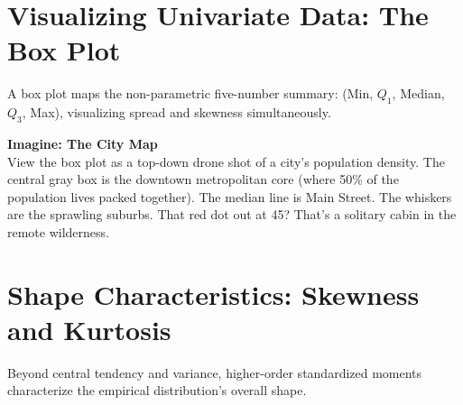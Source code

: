 \documentclass[12pt]{article}
\begin{document}
\section*{Visualizing Univariate Data: The Box Plot}
A box plot maps the non-parametric five-number summary: (Min, $Q_1$, Median, $Q_3$, Max), visualizing spread and skewness simultaneously.

\vspace{0.5cm}
\begin{center}
\end{center}
\vspace{0.2cm}

\vspace{0.5em}
\noindent\textbf{Imagine: The City Map}\\
View the box plot as a top-down drone shot of a city's population density. The central gray box is the downtown metropolitan core (where 50\% of the population lives packed together). The median line is Main Street. The whiskers are the sprawling suburbs. That red dot out at 45? That's a solitary cabin in the remote wilderness.


\section*{Shape Characteristics: Skewness and Kurtosis}
Beyond central tendency and variance, higher-order standardized moments characterize the empirical distribution's overall shape.
\end{document}
